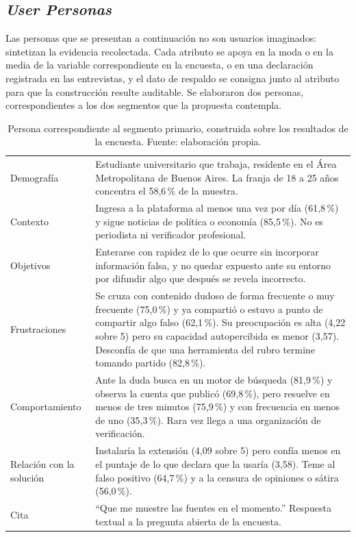 \subsection{\textit{User Personas}}
\label{sec:personas}

Las personas que se presentan a continuación no son usuarios imaginados: sintetizan la evidencia recolectada. Cada atributo se apoya en la moda o en la media de la variable correspondiente en la encuesta, o en una declaración registrada en las entrevistas, y el dato de respaldo se consigna junto al atributo para que la construcción resulte auditable. Se elaboraron dos personas, correspondientes a los dos segmentos que la propuesta contempla.

\begin{table}[t]
  \centering
  \caption{Persona correspondiente al segmento primario, construida sobre los resultados de la encuesta. Fuente: elaboración propia.}
  \label{tab:persona-1}
  \begin{tabular}{>{\raggedright\arraybackslash}p{3.3cm}p{10.2cm}}
    \hline
    \multicolumn{2}{l}{\textbf{Persona 1: Nicolás, 24 años. Ciudadano lector de noticias en X}} \\
    \hline
    Demografía & Estudiante universitario que trabaja, residente en el Área Metropolitana de Buenos Aires. La franja de 18 a 25 años concentra el 58,6\,\% de la muestra. \\
    Contexto & Ingresa a la plataforma al menos una vez por día (61,8\,\%) y sigue noticias de política o economía (85,5\,\%). No es periodista ni verificador profesional. \\
    Objetivos & Enterarse con rapidez de lo que ocurre sin incorporar información falsa, y no quedar expuesto ante su entorno por difundir algo que después se revela incorrecto. \\
    Frustraciones & Se cruza con contenido dudoso de forma frecuente o muy frecuente (75,0\,\%) y ya compartió o estuvo a punto de compartir algo falso (62,1\,\%). Su preocupación es alta (4,22 sobre 5) pero su capacidad autopercibida es menor (3,57). Desconfía de que una herramienta del rubro termine tomando partido (82,8\,\%). \\
    Comportamiento & Ante la duda busca en un motor de búsqueda (81,9\,\%) y observa la cuenta que publicó (69,8\,\%), pero resuelve en menos de tres minutos (75,9\,\%) y con frecuencia en menos de uno (35,3\,\%). Rara vez llega a una organización de verificación. \\
    Relación con la solución & Instalaría la extensión (4,09 sobre 5) pero confía menos en el puntaje de lo que declara que la usaría (3,58). Teme al falso positivo (64,7\,\%) y a la censura de opiniones o sátira (56,0\,\%). \\
    Cita & \enquote{Que me muestre las fuentes en el momento.} Respuesta textual a la pregunta abierta de la encuesta. \\
    \hline
  \end{tabular}
\end{table}

